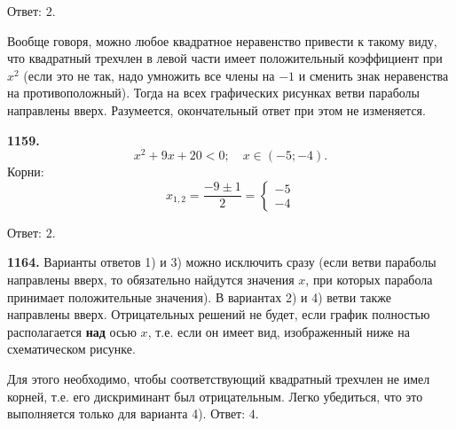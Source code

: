 \null \hspace*{\fill} Ответ: $2$.          

Вообще говоря, можно любое квадратное неравенство привести к такому виду, что квадратный трехчлен в левой части имеет положительный коэффициент при $x^2$ (если это не так, надо умножить все члены на $-1$ и сменить знак неравенства на противоположный). Тогда на всех графических рисунках ветви параболы направлены вверх. Разумеется, окончательный ответ при этом не изменяется.  

\textbf{1159.} $$x^2+9x+20<0;\quad x\in (-5;-4).$$
Корни: $$x_{1,2}=\frac{-9\pm1}{2}=\begin{cases}-5\\-4 \end{cases}$$

\begin{figure}[h!]
\end{figure}

\null \hspace*{\fill} Ответ: $2$.   

\textbf{1164.}  Варианты ответов 1) и 3) можно исключить сразу (если ветви параболы направлены вверх, то обязательно найдутся значения $x$, при которых парабола принимает положительные значения). В вариантах 2) и 4) ветви также направлены вверх. \newpage Отрицательных решений не будет, если график полностью располагается \textbf{над} осью $x$, т.е. если он имеет вид, изображенный ниже на схематическом рисунке. 

\begin{figure}[h!]
\end{figure}

Для этого необходимо, чтобы соответствующий квадратный трехчлен не имел корней, т.е. его дискриминант был отрицательным. Легко убедиться, что это выполняется только для варианта 4). \newline \null \hspace*{\fill} Ответ: $4$.    

